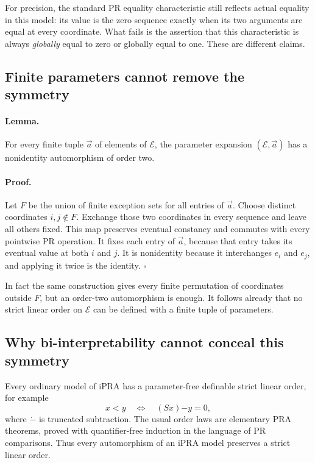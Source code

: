 \documentclass[11pt,letterpaper]{article}
\theoremstyle{definition}\newtheorem{definition}[theorem]{Definition}
\theoremstyle{remark}\newtheorem{remark}[theorem]{Remark}
\newcommand{\dotminus}{\dot{-}}
\begin{document}
For precision, the standard PR equality characteristic still reflects
actual equality in this model: its value is the zero sequence exactly
when its two arguments are equal at every coordinate.  What fails is
the assertion that this characteristic is always \emph{globally}
equal to zero or globally equal to one.  These are different claims.

\subsection{Finite parameters cannot remove the symmetry}

\paragraph{Lemma.}
For every finite tuple $\vec a$ of elements of $\mathcal E$, the
parameter expansion $(\mathcal E,\vec a)$ has a nonidentity
automorphism of order two.

\paragraph{Proof.}
Let $F$ be the union of finite exception sets for all entries of
$\vec a$.  Choose distinct coordinates $i,j\notin F$.  Exchange those
two coordinates in every sequence and leave all others fixed.  This
map preserves eventual constancy and commutes with every pointwise PR
operation.  It fixes each entry of $\vec a$, because that entry takes
its eventual value at both $i$ and $j$.  It is nonidentity because it
interchanges $e_i$ and $e_j$, and applying it twice is the identity.
\hfill$\square$

In fact the same construction gives every finite permutation of
coordinates outside $F$, but an order-two automorphism is enough.
It follows already that no strict linear order on $\mathcal E$ can
be defined with a finite tuple of parameters.

\subsection{Why bi-interpretability cannot conceal this symmetry}

Every ordinary model of iPRA has a parameter-free definable strict
linear order, for example
\[
 x<y\quad\Longleftrightarrow\quad (Sx)\mathbin{\dotminus}y=0,
\]
where $\dotminus$ is truncated subtraction.  The usual order laws
are elementary PRA theorems, proved with quantifier-free induction in
the language of PR comparisons.  Thus every automorphism of an iPRA
model preserves a strict linear order.
\end{document}
